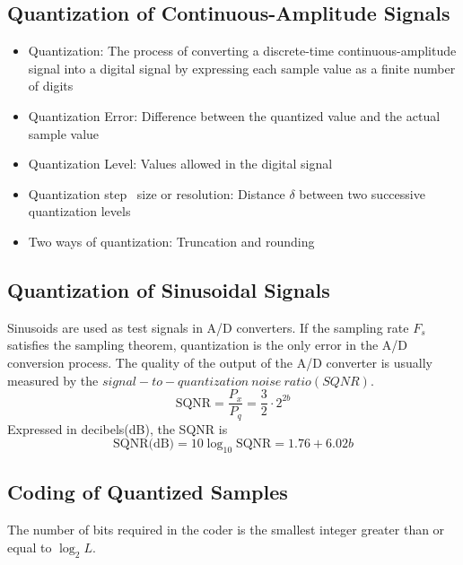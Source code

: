 \documentclass[10pt,a4paper,oneside]{article}
\begin{document}
\subsection{Quantization of Continuous-Amplitude Signals}
\begin{itemize}
\item Quantization: The process of converting a discrete-time continuous-amplitude signal into a digital signal by expressing each sample value as a finite number of digits
\item Quantization Error:  Difference between the quantized value and the actual sample value
\item Quantization Level: Values allowed in the digital signal
\item Quantization step \ size or resolution: Distance $\delta$ between two successive quantization levels
\item Two ways of quantization: Truncation and rounding
\end{itemize}
\subsection{Quantization of Sinusoidal Signals}
Sinusoids are used as test signals in A/D converters. If the sampling rate $F_s$ satisfies the sampling theorem, quantization is the only error in the A/D conversion process. The quality of the output of the A/D converter is usually measured by the $signal-to-quantization\ noise\ ratio(SQNR)$.
\[
\text{SQNR}=\frac{P_x}{P_q}=\frac{3}{2}\cdot2^{2b}
\]
Expressed in decibels(dB), the SQNR is
\[
\text{SQNR(dB)} = 10\log_{10}\text{SQNR}=1.76+6.02b
\]
\subsection{Coding of Quantized Samples}
The number of bits required in the coder is the smallest integer greater than or equal to $\log_2L$.
\end{document}
